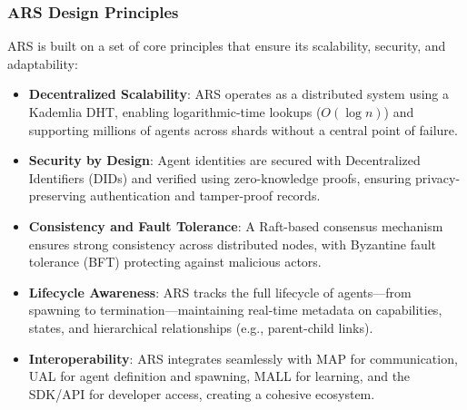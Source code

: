 \documentclass[a4paper,11pt]{article}
\begin{document}
\subsubsection{ARS Design Principles}
ARS is built on a set of core principles that ensure its scalability, security, and adaptability:
\begin{itemize}[leftmargin=*]
    \item \textbf{Decentralized Scalability}: ARS operates as a distributed system using a Kademlia DHT, enabling logarithmic-time lookups ($O(\log n)$) and supporting millions of agents across shards without a central point of failure.
    \item \textbf{Security by Design}: Agent identities are secured with Decentralized Identifiers (DIDs) and verified using zero-knowledge proofs, ensuring privacy-preserving authentication and tamper-proof records.
    \item \textbf{Consistency and Fault Tolerance}: A Raft-based consensus mechanism ensures strong consistency across distributed nodes, with Byzantine fault tolerance (BFT) protecting against malicious actors.
    \item \textbf{Lifecycle Awareness}: ARS tracks the full lifecycle of agents—from spawning to termination—maintaining real-time metadata on capabilities, states, and hierarchical relationships (e.g., parent-child links).
    \item \textbf{Interoperability}: ARS integrates seamlessly with MAP for communication, UAL for agent definition and spawning, MALL for learning, and the SDK/API for developer access, creating a cohesive ecosystem.
\end{itemize}
\end{document}

